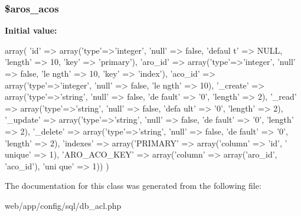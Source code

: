 \hypertarget{class_db_acl_schema_a3a0eae870cd1ad11190f9360b9e71e6b}{
\subsubsection[{\$aros\_\-acos}]{\setlength{\rightskip}{0pt plus 5cm}\$aros\_\-acos}}
\label{class_db_acl_schema_a3a0eae870cd1ad11190f9360b9e71e6b}
{\bfseries Initial value:}
\begin{DoxyCode}
 array(
                        'id' => array('type'=>'integer', 'null' => false, 'defaul
      t' => NULL, 'length' => 10, 'key' => 'primary'),
                        'aro_id' => array('type'=>'integer', 'null' => false, 'le
      ngth' => 10, 'key' => 'index'),
                        'aco_id' => array('type'=>'integer', 'null' => false, 'le
      ngth' => 10),
                        '_create' => array('type'=>'string', 'null' => false, 'de
      fault' => '0', 'length' => 2),
                        '_read' => array('type'=>'string', 'null' => false, 'defa
      ult' => '0', 'length' => 2),
                        '_update' => array('type'=>'string', 'null' => false, 'de
      fault' => '0', 'length' => 2),
                        '_delete' => array('type'=>'string', 'null' => false, 'de
      fault' => '0', 'length' => 2),
                        'indexes' => array('PRIMARY' => array('column' => 'id', '
      unique' => 1), 'ARO_ACO_KEY' => array('column' => array('aro_id', 'aco_id'), 'uni
      que' => 1))
                )
\end{DoxyCode}


The documentation for this class was generated from the following file:\begin{DoxyCompactItemize}
\item 
web/app/config/sql/db\_\-acl.php\end{DoxyCompactItemize}
